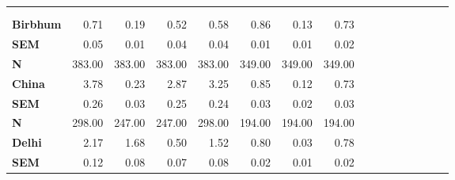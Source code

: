 \begin{tabular}{@{\extracolsep{5pt}}lrrrrrrrrrrrrrrr}
\toprule
&  &  &  &  &  &  &  \\
{\bf } &  &  &  &  &  &  &  \\
\hline
{\bf Birbhum} & 0.71\phantom{***} & 0.19\phantom{***} & 0.52\phantom{***} & 0.58\phantom{***} & 0.86\phantom{***} & 0.13\phantom{***} & 0.73\phantom{***} \\
{\bf SEM} & 0.05\phantom{***} & 0.01\phantom{***} & 0.04\phantom{***} & 0.04\phantom{***} & 0.01\phantom{***} & 0.01\phantom{***} & 0.02\phantom{***} \\
{\bf N} & 383.00\phantom{***} & 383.00\phantom{***} & 383.00\phantom{***} & 383.00\phantom{***} & 349.00\phantom{***} & 349.00\phantom{***} & 349.00\phantom{***} \\
{\bf China} & 3.78\phantom{***} & 0.23\phantom{***} & 2.87\phantom{***} & 3.25\phantom{***} & 0.85\phantom{***} & 0.12\phantom{***} & 0.73\phantom{***} \\
{\bf SEM} & 0.26\phantom{***} & 0.03\phantom{***} & 0.25\phantom{***} & 0.24\phantom{***} & 0.03\phantom{***} & 0.02\phantom{***} & 0.03\phantom{***} \\
{\bf N} & 298.00\phantom{***} & 247.00\phantom{***} & 247.00\phantom{***} & 298.00\phantom{***} & 194.00\phantom{***} & 194.00\phantom{***} & 194.00\phantom{***} \\
{\bf Delhi} & 2.17\phantom{***} & 1.68\phantom{***} & 0.50\phantom{***} & 1.52\phantom{***} & 0.80\phantom{***} & 0.03\phantom{***} & 0.78\phantom{***} \\
{\bf SEM} & 0.12\phantom{***} & 0.08\phantom{***} & 0.07\phantom{***} & 0.08\phantom{***} & 0.02\phantom{***} & 0.01\phantom{***} & 0.02\phantom{***} \\

\end{tabular}
